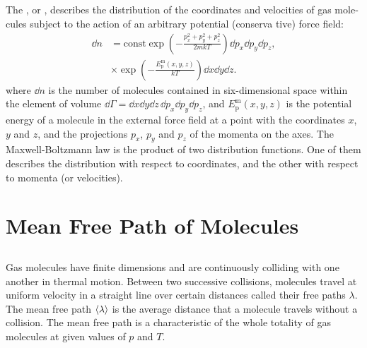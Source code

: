 \subsection{}\label{10.4.3} The , or , describes the distribution of the coordinates and velocities of gas mole­ cules subject to the action of an arbitrary potential (conserva­ tive) force field:
\begin{align*}%
\dd n & = \text{const} \exp\left( -\frac{p_{x}^{2}+p_{y}^{2}+p_{z}^{2}}{2mkT}\right) \dd p_{x} \dd p_{y} \dd p_{z}, \\
& \times \exp\left( -\frac{E_{\text{p}}^{\text{m}}(x,y,z)}{kT}\right)  \dd x \dd y \dd z.
\end{align*}
where $\dd n$ is the number of molecules contained in six-dimensio­nal space within the element of volume $\dd \Gamma=\dd x \dd y \dd z \, \dd p_{x} \dd p_{y} \dd p_{z}$, and $E_{\text{p}}^{\text{m}}(x,y,z)$ is the potential energy of a molecule in the external force field at a point with the coordinates $x$, $y$ and $z$, and the projections $p_{x}$, $p_{y}$ and $p_{z}$ of the momenta on the axes. The Maxwell-Boltzmann law is the product of two distribution functions. One of them describes the distribution with respect to coordinates, and the other with respect to momenta (or velocities).


\section{Mean Free Path of Molecules}


\subsection{}\label{10.5.1} Gas molecules have finite dimensions  and are continuously colliding with one another in thermal motion. Between two successive collisions, molecules travel at uniform velocity in a straight line over certain distances called their free paths $\lambda$. The mean free path $\expval{\lambda}$ is the average distance that a molecule travels without a collision. The mean free path is a characteristic of the whole totality of gas molecules at given values of $p$ and $T$.

